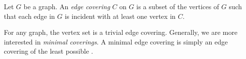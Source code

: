 \documentclass[12pt]{article}
\begin{document}
Let $G$ be a graph.  An \emph{edge covering} $C$ on $G$ is a subset of the vertices of $G$ such that each edge in $G$ is incident with at least one vertex in $C$.

For any graph, the  vertex set is a trivial edge covering.  Generally, we are more interested in \emph{minimal coverings}.  A minimal edge covering is simply an edge covering of the least possible .
\end{document}
